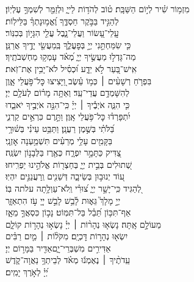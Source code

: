 \documentclass[twoside, openany, parskip=half, 11pt]{book}
\begin{document}
\begin{narrow}
 
מִזְמ֥וֹר שִׁ֗יר לְי֣וֹם הַשַּׁבָּֽת׃\hfill \break 
ט֗וֹב לְהֹד֥וֹת לַייָ֑ \hfill וּלְזַמֵּ֖ר לְשִׁמְךָ֣ עֶלְיֽוֹן׃ \\
 לְהַגִּ֣יד בַּבֹּ֣קֶר חַסְדֶּ֑ךָ \hfill וֶ֝אֱמ֥וּנָתְךָ֗ בַּלֵּילֽוֹת׃ \\
 עֲֽלֵי־עָ֭שׂוֹר וַעֲלֵי־נָ֑בֶל \hfill עֲלֵ֖י הִגָּי֣וֹן בְּכִנּֽוֹר׃ \\
 כִּ֤י שִׂמַּחְתַּ֣נִי יְיָ֣ בְּפׇעֳלֶ֑ךָ \hfill בְּֽמַעֲשֵׂ֖י יָדֶ֣יךָ אֲרַנֵּֽן׃ \\
 מַה־גָּדְל֣וּ מַעֲשֶׂ֣יךָ יְיָ֑ \hfill מְ֝אֹ֗ד עָמְק֥וּ מַחְשְׁבֹתֶֽיךָ׃ \\
 אִֽישׁ־בַּ֭עַר לֹ֣א יֵדָ֑ע \hfill וּ֝כְסִ֗יל לֹא־יָבִ֥ין אֶת־זֹֽאת׃ \\
 בִּפְרֹ֤חַ רְשָׁעִ֨ים ׀ כְּמ֥וֹ עֵ֗שֶׂב \hfill וַ֭יָּצִיצוּ כׇּל־פֹּ֣עֲלֵי אָ֑וֶן\\ לְהִשָּׁמְדָ֥ם עֲדֵי־עַֽד׃ \hfill
 וְאַתָּ֥ה מָר֗וֹם לְעֹלָ֥ם יְיָ׃ \\
 כִּ֤י הִנֵּ֪ה אֹיְבֶ֡יךָ ׀ יְיָ֗ \hfill כִּֽי־הִנֵּ֣ה אֹיְבֶ֣יךָ יֹאבֵ֑דוּ\\ יִ֝תְפָּרְד֗וּ כׇּל־פֹּ֥עֲלֵי אָֽוֶן׃ \hfill
 וַתָּ֣רֶם כִּרְאֵ֣ים קַרְנִ֑י\\ בַּ֝לֹּתִ֗י בְּשֶׁ֣מֶן רַעֲנָֽן׃ \hfill
 וַתַּבֵּ֥ט עֵינִ֗י בְּשׁ֫וּרָ֥י\\ בַּקָּמִ֖ים עָלַ֥י מְרֵעִ֗ים \hfill תִּשְׁמַ֥עְנָה אׇזְנָֽי׃ \\
 צַ֭דִּיק כַּתָּמָ֣ר יִפְרָ֑ח \hfill כְּאֶ֖רֶז בַּלְּבָנ֣וֹן יִשְׂגֶּֽה׃ \\
 שְׁ֭תוּלִים בְּבֵ֣ית יְיָ֑ \hfill בְּחַצְר֖וֹת אֱלֹהֵ֣ינוּ יַפְרִֽיחוּ׃ \\
 ע֭וֹד יְנוּב֣וּן בְּשֵׂיבָ֑ה \hfill דְּשֵׁנִ֖ים וְֽרַעֲנַנִּ֣ים יִהְיֽוּ׃ \\
 לְ֭הַגִּיד כִּֽי־יָשָׁ֣ר יְיָ֑ \hfill צ֝וּרִ֗י וְֽלֹא־עַוְלָ֥תָה עלתה בּֽוֹ׃ \\



יְיָ֣ מָלָךְ֮ גֵּא֢וּת לָ֫בֵ֥שׁ\hfill
לָבֵ֣שׁ יְיָ֭ עֹ֣ז הִתְאַזָּ֑ר\\ אַף־תִּכּ֥וֹן תֵּ֝בֵ֗ל בַּל־תִּמּֽוֹט׃ \hfill
 נָכ֣וֹן כִּסְאֲךָ֣ מֵאָ֑ז\\ מֵעוֹלָ֣ם אָֽתָּה׃ \hfill
 נָשְׂא֤וּ נְהָר֨וֹת ׀ יְיָ֗ נָשְׂא֣וּ נְהָר֣וֹת קוֹלָ֑ם\\ יִשְׂא֖וּ נְהָר֣וֹת דׇּכְיָֽם׃ \hfill
 מִקֹּל֨וֹת ׀ מַ֤יִם רַבִּ֗ים\\ אַדִּירִ֣ים מִשְׁבְּרֵי־יָ֑ם\hfill אַדִּ֖יר בַּמָּר֣וֹם יְיָ׃ \\
 עֵֽדֹתֶ֨יךָ ׀ נֶאֶמְנ֬וּ מְאֹ֗ד \hfill לְבֵיתְךָ֥ נַאֲוָה־קֹ֑דֶשׁ\\ יְ֝יָ֗  לְאֹ֣רֶךְ יָמִֽים׃ \hfill \break

\end{narrow}
\end{document}
